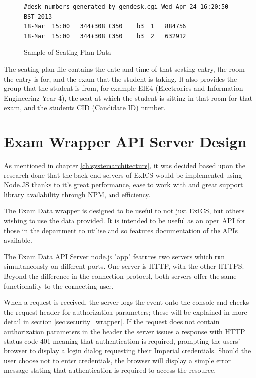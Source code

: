 \begin{figure}[!htbp]
\centering
\begin{lstlisting}[tabsize=2,breaklines=true]
#desk numbers generated by gendesk.cgi Wed Apr 24 16:20:50 BST 2013						
18-Mar	15:00	344+308	C350	b3	1	884756
18-Mar	15:00	344+308	C350	b3	2	632912
\end{lstlisting}
\caption{Sample of Seating Plan Data}
\label{fig:seating_plan_data}
\end{figure}

The seating plan file contains the date and time of that seating entry, the room the entry is for, and the exam that the student is taking.  It also provides the group that the student is from, for example EIE4 (Electronics and Information Engineering Year 4), the seat at which the student is sitting in that room for that exam, and the students CID (Candidate ID) number.

\FloatBarrier

\section{Exam Wrapper API Server Design}

\FloatBarrier

As mentioned in chapter \ref{ch:systemarchitecture}, it was decided based upon the research done that the back-end servers of ExICS would be implemented using Node.JS thanks to it's great performance, ease to work with and great support library availability through NPM, and efficiency.\cite{understandingNode}

The Exam Data wrapper is designed to be useful to not just ExICS, but others wishing to use the data provided.  It is intended to be useful as an open API for those in the department to utilise and so features documentation of the APIs available.

The Exam Data API Server node.js "app" features two servers which run simultaneously on different ports.  One server is HTTP, with the other HTTPS.  Beyond the difference in the connection protocol, both servers offer the same functionality to the connecting user.

When a request is received, the server logs the event onto the console and checks the request header for authorization parameters; these will be explained in more detail in section \ref{sec:security_wrapper}.  If the request does not contain authorization parameters in the header the server issues a response with HTTP status code 401 meaning that authentication is required, prompting the users' browser to display a login dialog requesting their Imperial credentials.  Should the user choose not to enter credentials, the browser will display a simple error message stating that authentication is required to access the resource.

